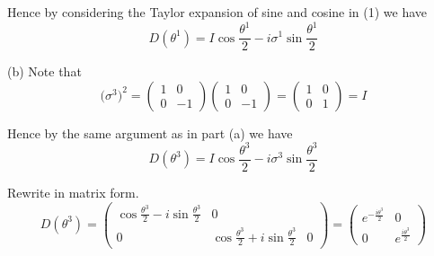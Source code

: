 Hence by considering the Taylor expansion of sine and cosine in (1) we have
\begin{equation*}
D(\theta^1)=I\cos\frac{\theta^1}{2}-i\sigma^1\sin\frac{\theta^1}{2}
\end{equation*}

(b) Note that
\begin{equation*}
\big(\sigma^3\big)^2=\begin{pmatrix}1&0\\0&-1\end{pmatrix}\begin{pmatrix}1&0\\0&-1\end{pmatrix}
=\begin{pmatrix}1&0\\0&1\end{pmatrix}=I
\end{equation*}

Hence by the same argument as in part (a) we have
\begin{equation*}
D(\theta^3)=I\cos\frac{\theta^3}{2}-i\sigma^3\sin\frac{\theta^3}{2}
\end{equation*}

Rewrite in matrix form.
\begin{equation*}
D(\theta^3)
=\begin{pmatrix}
\cos\frac{\theta^3}{2}-i\sin\frac{\theta^3}{2}&0
\\
0&\cos\frac{\theta^3}{2}+i\sin\frac{\theta^3}{2}&0
\end{pmatrix}
=\begin{pmatrix}e^{-\frac{i\theta^3}{2}}&0\\0&e^\frac{i\theta^3}{2}\end{pmatrix}
\end{equation*}


